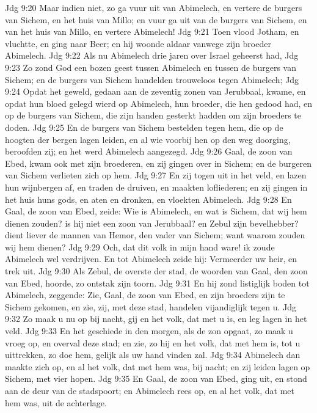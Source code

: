 Jdg 9:20  Maar indien niet, zo ga vuur uit van Abimelech, en vertere de burgers van Sichem, en het huis van Millo; en vuur ga uit van de burgers van Sichem, en van het huis van Millo, en vertere Abimelech!
Jdg 9:21  Toen vlood Jotham, en vluchtte, en ging naar Beer; en hij woonde aldaar vanwege zijn broeder Abimelech.
Jdg 9:22  Als nu Abimelech drie jaren over Israel geheerst had,
Jdg 9:23  Zo zond God een bozen geest tussen Abimelech en tussen de burgers van Sichem; en de burgers van Sichem handelden trouweloos tegen Abimelech;
Jdg 9:24  Opdat het geweld, gedaan aan de zeventig zonen van Jerubbaal, kwame, en opdat hun bloed gelegd wierd op Abimelech, hun broeder, die hen gedood had, en op de burgers van Sichem, die zijn handen gesterkt hadden om zijn broeders te doden.
Jdg 9:25  En de burgers van Sichem bestelden tegen hem, die op de hoogten der bergen lagen leiden, en al wie voorbij hen op den weg doorging, beroofden zij; en het werd Abimelech aangezegd.
Jdg 9:26  Gaal, de zoon van Ebed, kwam ook met zijn broederen, en zij gingen over in Sichem; en de burgeren van Sichem verlieten zich op hem.
Jdg 9:27  En zij togen uit in het veld, en lazen hun wijnbergen af, en traden de druiven, en maakten lofliederen; en zij gingen in het huis huns gods, en aten en dronken, en vloekten Abimelech.
Jdg 9:28  En Gaal, de zoon van Ebed, zeide: Wie is Abimelech, en wat is Sichem, dat wij hem dienen zouden? is hij niet een zoon van Jerubbaal? en Zebul zijn bevelhebber? dient liever de mannen van Hemor, den vader van Sichem; want waarom zouden wij hem dienen?
Jdg 9:29  Och, dat dit volk in mijn hand ware! ik zoude Abimelech wel verdrijven. En tot Abimelech zeide hij: Vermeerder uw heir, en trek uit.
Jdg 9:30  Als Zebul, de overste der stad, de woorden van Gaal, den zoon van Ebed, hoorde, zo ontstak zijn toorn.
Jdg 9:31  En hij zond listiglijk boden tot Abimelech, zeggende: Zie, Gaal, de zoon van Ebed, en zijn broeders zijn te Sichem gekomen, en zie, zij, met deze stad, handelen vijandiglijk tegen u.
Jdg 9:32  Zo maak u nu op bij nacht, gij en het volk, dat met u is, en leg lagen in het veld.
Jdg 9:33  En het geschiede in den morgen, als de zon opgaat, zo maak u vroeg op, en overval deze stad; en zie, zo hij en het volk, dat met hem is, tot u uittrekken, zo doe hem, gelijk als uw hand vinden zal.
Jdg 9:34  Abimelech dan maakte zich op, en al het volk, dat met hem was, bij nacht; en zij leiden lagen op Sichem, met vier hopen.
Jdg 9:35  En Gaal, de zoon van Ebed, ging uit, en stond aan de deur van de stadspoort; en Abimelech rees op, en al het volk, dat met hem was, uit de achterlage.
